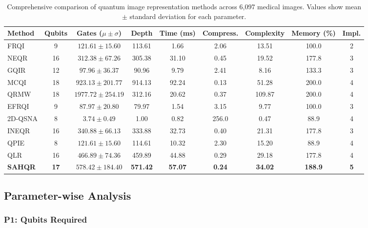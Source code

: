 \documentclass[pdflatex,sn-mathphys-num,Numbered]{sn-jnl}
\theoremstyle{thmstyleone}
\theoremstyle{thmstyletwo}
\theoremstyle{thmstylethree}
\begin{document}
\begin{table}[h!]
\caption{Comprehensive comparison of quantum image representation methods across 6,097 medical images. Values show mean $\pm$ standard deviation for each parameter.}
\label{tab:main_results}
\centering
\small
\begin{tabular}{@{}lcccccccc@{}}
\toprule
Method & Qubits & Gates ($\mu \pm \sigma$) & Depth & Time (ms) & Compress. & Complexity & Memory (\%) & Impl. \\
\midrule
FRQI \cite{bib18} & 9 & $121.61 \pm 15.60$ & 113.61 & 1.66 & 2.06 & 13.51 & 100.0 & 2 \\
NEQR \cite{bib19} & 16 & $312.38 \pm 67.26$ & 305.38 & 31.10 & 0.45 & 19.52 & 177.8 & 3 \\
GQIR \cite{bib46,bib15} & 12 & $97.96 \pm 36.37$ & 90.96 & 9.79 & 2.41 & 8.16 & 133.3 & 3 \\
MCQI \cite{bib47,bib13} & 18 & $923.13 \pm 201.77$ & 914.13 & 92.24 & 0.13 & 51.28 & 200.0 & 4 \\
QRMW \cite{bib48,bib49} & 18 & $1977.72 \pm 254.19$ & 312.16 & 20.62 & 0.37 & 109.87 & 200.0 & 4 \\
EFRQI \cite{bib50,bib51} & 9 & $87.97 \pm 20.80$ & 79.97 & 1.54 & 3.15 & 9.77 & 100.0 & 3 \\
2D-QSNA \cite{bib52,bib53} & 8 & $3.74 \pm 0.49$ & 1.00 & 0.82 & 256.0 & 0.47 & 88.9 & 4 \\
INEQR \cite{bib54,bib55} & 16 & $340.88 \pm 66.13$ & 333.88 & 32.73 & 0.40 & 21.31 & 177.8 & 3 \\
QPIE \cite{bib56,bib57} & 8 & $121.61 \pm 15.60$ & 114.61 & 10.32 & 2.30 & 15.20 & 88.9 & 4 \\
QLR \cite{bib58,bib49} & 16 & $466.89 \pm 74.36$ & 459.89 & 44.88 & 0.29 & 29.18 & 177.8 & 4 \\
\textbf{SAHQR} & \textbf{17} & $\mathbf{578.42 \pm 184.40}$ & \textbf{571.42} & \textbf{57.07} & \textbf{0.24} & \textbf{34.02} & \textbf{188.9} & \textbf{5} \\
\bottomrule
\end{tabular}
\end{table}

\subsection{Parameter-wise Analysis}

\subsubsection{P1: Qubits Required}
\end{document}
